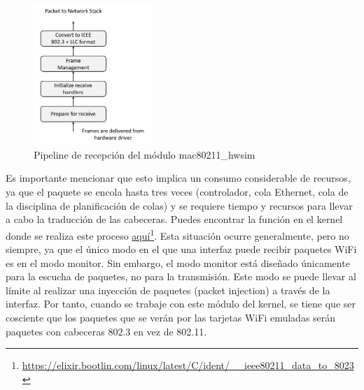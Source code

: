 \begin{figure}[ht]
    \centering
    \includegraphics[width=0.4\textwidth]{archivos/img/teoria/linux_wireless_subsystem_rx.png}
    \caption{Pipeline de recepción del módulo mac80211\_hwsim \cite{5415877}}
    \label{fig:analysis_p4_wifi_8}
\end{figure}

Es importante mencionar que esto implica un consumo considerable de recursos, ya que el paquete se encola hasta tres veces (controlador, cola Ethernet, cola de la disciplina de planificación de colas) y se requiere tiempo y recursos para llevar a cabo la traducción de las cabeceras. Puedes encontrar la función en el kernel donde se realiza este proceso \href{https://elixir.bootlin.com/linux/latest/C/ident/__ieee80211_data_to_8023}{aquí}\footnote{\url{https://elixir.bootlin.com/linux/latest/C/ident/__ieee80211_data_to_8023}}. Esta situación ocurre generalmente, pero no siempre, ya que el único modo en el que una interfaz puede recibir paquetes WiFi es en el modo monitor. Sin embargo, el modo monitor está diseñado únicamente para la escucha de paquetes, no para la transmisión. Este modo se puede llevar al límite al realizar una inyección de paquetes (packet injection) a través de la interfaz. Por tanto, cuando se trabaje con este módulo del kernel, se tiene que ser cosciente que los paquetes que se verán por las tarjetas WiFi emuladas serán paquetes con cabeceras 802.3 en vez de 802.11.